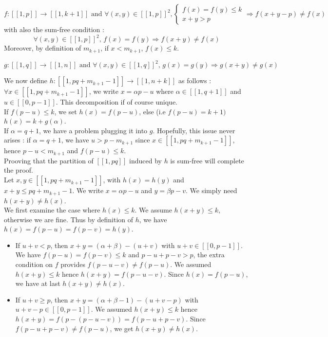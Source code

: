 \[ f : [\![1,p]\!] \longrightarrow [\![1,k+1]\!] \text{ and } \forall (x,y) \in [\![1,p]\!]^2, \left\{
\begin{array}{ll}
	f(x) = f(y) \leqslant k \\
	x + y > p
\end{array}
\right.
\Longrightarrow f(x+y-p) \neq f(x)
\]
with also the sum-free condition : \[ \forall (x,y) \in [\![1,p]\!]^2 \text{, } f(x) = f(y)
\Longrightarrow f(x+y) \neq f(x) \]
Moreover, by definition of \(m_{k+1}\), if \(x < m_{k+1}\), \(f(x) \leqslant k\).

\[g : [\![1,q]\!] \longrightarrow [\![1,n]\!] \text{ and } \forall (x,y) \in [\![1,q]\!]^2 \text{, } g(x) = g(y)
\Longrightarrow g(x+y) \neq g(x)
\]

We now define \(h : [\![1,pq+m_{k+1}-1]\!] \longrightarrow [\![1,n+k]\!] \) as follows :
\( \forall x \in [\![1,pq + m_{k+1}-1]\!] \), we write \(x = \alpha p - u\) where \(\alpha \in [\![1,q+1]\!] \) and \( u \in
[\![0,p-1]\!] \).
This decomposition if of course unique. \\

If \(f(p-u) \leqslant k\), we set \(h(x) = f(p-u)\), else (i.e \(f(p-u) = k + 1)\) \(h(x) = k + g(\alpha) \). \\
If \(\alpha = q+1\), we have a problem plugging it into \(g\). Hopefully, this issue never arises : if 
\(\alpha = q+1\), we have \(u > p - m_{k+1}\) since \(x \in [\![1,pq + m_{k+1}-1]\!]\), hence \(p-u < m_{k+1}\) and \(f(p-u) \leqslant k\). \\

Prooving that the partition of \([\![1,pq]\!]\) induced by \(h\) is sum-free will complete the proof.\\

Let \(x,y \in [\![1,pq + m_{k+1}-1]\!]\), with \(h(x) = h(y)\) and \(x+y \leqslant pq+m_{k+1}-1\). We write \(x = \alpha p - u\) and \(y =
\beta p - v\). We simply need \(h(x+y) \neq h(x)\). \\

We first examine the case where \(h(x) \leqslant k\). We assume \(h(x+y) \leqslant k\), otherwise we are fine. 
Thus by definition of \(h\), we have \(h(x) = f(p-u) = f(p-v) = h(y)\).
\begin{itemize}
\item If \(u+v < p\), then \(x+y = (\alpha+\beta) - (u+v) \) with \(u+v \in [\![0,p-1]\!] \).
We have \(f(p-u) = f(p-v) \leqslant k\) and \(p-u + p-v > p\), the extra condition on \(f\) provides \(f(p-u-v) \neq
f(p-u)\).
We assumed \(h(x+y) \leqslant k\) hence \(h(x+y) = f(p-u-v)\). Since \(h(x) = f(p-u)\), we have at last \(h(x+y) \neq
h(x)\).
\item If \(u+v \geqslant p\), then \(x+y = (\alpha+\beta-1) - (u+v-p) \) with \(u+v-p \in [\![0,p-1]\!] \).
We assumed \(h(x+y) \leqslant k \) hence \(h(x+y) = f( p- (p-u-v)) = f(p-u + p-v)\). Since \(f(p-u+p-v) \neq f(p-u)\),
we get \(h(x+y) \neq h(x)\).
\end{itemize} 
  
